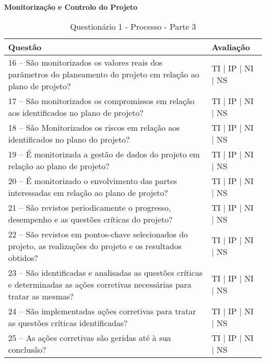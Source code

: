 \documentclass[openany,10pt,a4paper]{article}
\begin{document}
\begin{appendix}
\begin{table}[h]
\textbf{Monitorização e Controlo do Projeto}
	\centering
	\caption{Questionário 1 - Processo - Parte 3}
	\begin{tabular}{p{3.5in}p{2in}}		
		\toprule
		\textbf{Questão}  & \textbf{Avaliação}\\ 
		\midrule
		16 – São monitorizados os valores reais dos parâmetros do planeamento do projeto em relação 
ao plano de projeto? 
 & TI | IP | NI | NS \\
        \midrule
		17 – São monitorizados os compromissos em relação aos identificados no plano de projeto?
 & TI | IP | NI | NS \\
		\midrule
		18 – São Monitorizados os riscos em relação aos identificados no plano do projeto?
 & TI | IP | NI | NS \\
		\midrule
        19 – É monitorizada a gestão de dados do projeto em relação ao plano de projeto?
 & TI | IP | NI | NS \\
		\midrule
		20 – É monitorizado o envolvimento das partes interessadas em relação ao plano de projeto?
  & TI | IP | NI | NS \\
		\midrule
		21 – São revistos periodicamente o progresso, desempenho e as questões críticas do projeto?
 & TI | IP | NI | NS \\
		\midrule
		22 – São revistos em pontos-chave selecionados do projeto, as realizações do projeto e os 
resultados obtidos?
 & TI | IP | NI | NS \\
        \midrule
        23 – São identificadas e analisadas as questões críticas e determinadas as ações corretivas 
necessárias para tratar as mesmas?
 & TI | IP | NI | NS \\
		\midrule
		24 – São implementadas ações corretivas para tratar as questões críticas identificadas?
 & TI | IP | NI | NS \\
		\midrule
		25 – As ações corretivas são geridas até à sua conclusão?
 & TI | IP | NI | NS \\
		\bottomrule
	\end{tabular} 
	\label{tab:tabela1}
\end{table}


\end{appendix}
\end{document}
